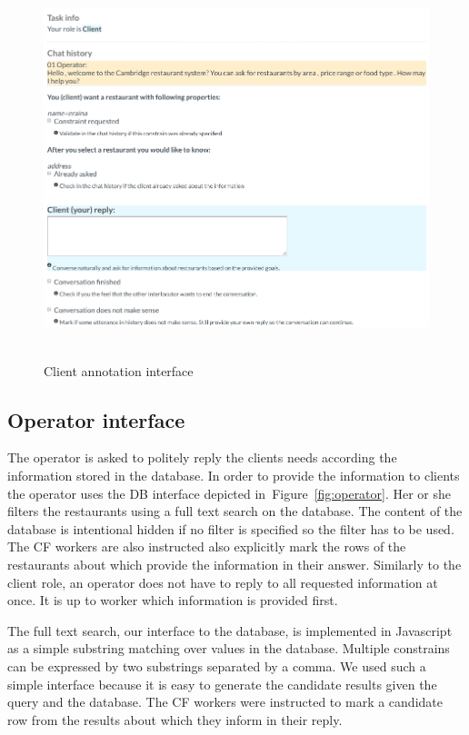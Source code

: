 \documentclass[runningheads,a4paper]{llncs}
\begin{document}
\begin{figure}
\vspace{-1.00em}
\begin{center}
\includegraphics[height=30em]{gui-annotators-client}
\caption{Client annotation interface}
\end{center}
\vspace{-1.00em}
\label{fig:client}
\end{figure}
\vspace{-1.00em}

\vspace{-1.00em}
\subsection{Operator interface}
\label{sec:operator}
The operator is asked to politely reply the clients needs according the information stored in the database.
In order to provide the information to clients the operator uses the DB interface depicted in~Figure~\ref{fig:operator}.
Her or she filters the restaurants using a full text search on the database.
The content of the database is intentional hidden if no filter is specified so the filter has to be used.
The CF workers are also instructed also explicitly mark the rows of the restaurants about which provide the information in their answer.
Similarly to the client role, an operator does not have to reply to all requested information at once.
It is up to worker which information is provided first.

The full text search, our interface to the database, is implemented in Javascript as a simple substring matching over values in the database.
Multiple constrains can be expressed by two substrings separated by a comma.
We used such a simple interface because it is easy to generate the candidate results given the query and the database.
The CF workers were instructed to mark a candidate row from the results about which they inform in their reply.
\end{document}
